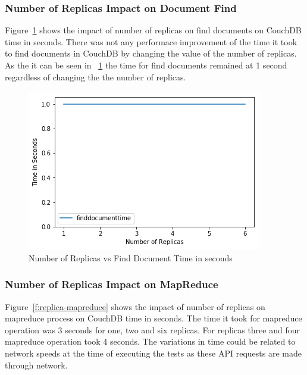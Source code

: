 \subsubsection{Number of Replicas Impact on Document Find}


Figure~\ref{f:replica-find} shows the impact of number of replicas on find
documents on CouchDB time in seconds. There was not any performace
improvement of the time it took to find documents in CouchDB  by
changing the value of the number of replicas. As the it can be seen in
~\ref{f:replica-find} the time for find documents remained at 1 second
regardless of changing the the number of replicas.

\begin{figure}[!ht]
  \centering\includegraphics[width=\columnwidth]{../images/ReplicasFindDoc.png}
  \caption{Number of Replicas vs Find Document Time in seconds }\label{f:replica-find}
\end{figure}

\subsubsection{Number of Replicas Impact on MapReduce}


Figure~\ref{f:replica-mapreduce} shows the impact of number of replicas on
mapreduce process on CouchDB time in seconds. The time it took for
mapreduce operation was 3 seconds for one, two and six replicas. For
replicas three and four mapreduce operation took 4 seconds. The
variations in time could be related to network speeds at the time of
executing the tests as these API requests are made through network. 

